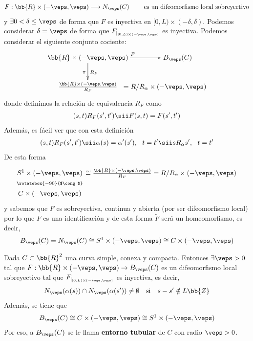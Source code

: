 \begin{gather*}
    F: \bb{R}\times (-\veps, \veps) \longrightarrow N_\veps(C) \qquad \text{ es un difeomorfismo local sobreyectivo}
\end{gather*}
y $\exists 0 < \delta \leq \veps$ de forma que $F$ es inyectiva en $[0,L) \times (-\delta, \delta)$. Podemos considerar $\delta=\veps$ de forma que $F_{|_{[0,L)\times(-\veps, \veps)}}$ es inyectiva. Podemos considerar el siguiente conjunto cociente:
\begin{gather*}
    \xymatrix{
        \bb{R}\times(-\veps, \veps) \ar[r]^{F} \ar[d]_\pi^{R_F} & B_\veps(C) \\
        \frac{\bb{R}\times (-\veps, \veps)}{R_F} & \hspace{-1.4cm} {{} = R/R_\alpha \times (-\veps, \veps)}
    }
\end{gather*}
donde definimos la relación de equivalencia $R_F$ como
\begin{gather*}
    (s,t)R_F (s',t') \sii F(s,t) = F(s',t') %
\end{gather*}
Además, es fácil ver que con esta definición
\begin{gather*}
    (s,t)R_F (s',t') \sii \alpha(s)=\alpha'(s'),\ \ t=t' \sii sR_\alpha s',\ \ t=t'
\end{gather*}
De esta forma
\begin{gather*}
    \xymatrix@R=1.2em{
        S^1 \times (-\veps, \veps) \ar@{}[d]|{\rotatebox{-90}{$\cong$}} & \hspace{-0.9cm} \cong \frac{\bb{R}\times(-\veps, \veps)}{R_F} = R/R_\alpha \times (-\veps, \veps)\\
        C\times(-\veps, \veps)
    }
\end{gather*}
y sabemos que $F$ es sobreyectiva, continua y abierta (por ser difeomorfismo local) por lo que $F$ es una identificación y de esta forma $\tilde{F}$ será un homeomorfismo, es decir,
\begin{gather*}
    B_\veps(C) = N_\veps(C) \cong S^1 \times (-\veps, \veps)\cong C \times(-\veps, \veps)
\end{gather*}

\begin{teo}\label{teo:exist_ent_tub}
    Dada $C\subset \bb{R}^2$ una curva simple, conexa y compacta. Entonces $\exists \veps > 0$ tal que $F:\bb{R}\times(-\veps, \veps) \to B_\veps(C)$ es un difeomorfismo local sobreyectivo tal que $F_{|_{[0,L)\times(-\veps, \veps)}}$ es inyectiva, es decir,
    \begin{gather*}
        N_\veps(\alpha(s))\cap N_\veps(\alpha(s')) \neq \emptyset \quad \text{si} \quad s-s'\notin L\bb{Z}
    \end{gather*}
    Además, se tiene que 
    \begin{gather*}
        B_\veps(C) \cong C \times(-\veps, \veps) \cong S^1 \times (-\veps, \veps)
    \end{gather*}
    Por eso, a $B_\veps(C)$ se le llama \textbf{entorno tubular} de $C$ con radio $\veps>0$.
\end{teo}

